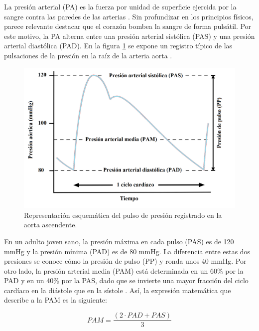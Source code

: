 La presión arterial (PA) es la fuerza por unidad de superficie ejercida por la sangre contra las paredes 
de las arterias \citep{CITE:1}. Sin profundizar en los principios físicos, parece relevante destacar que el corazón 
bombea la sangre de forma pulsátil. Por este motivo, la PA alterna entre una presión arterial sistólica (PAS) 
y una presión arterial diastólica (PAD). En la figura \ref{fig:aorticPulse} se expone un registro típico de las pulsaciones 
de la presión en la raíz de la arteria aorta \citep{CITE:2} \citep{CITE:3}. 

\begin{figure}[h!]
  \centering
  \includegraphics[width=\textwidth]{./Figures/aortic-pulse-pressure.png}
  \caption{Representación esquemática del pulso de presión registrado en la aorta ascendente\protect\footnotemark.}\label{fig:aorticPulse}
\end{figure}


En un adulto joven sano, la presión máxima en cada pulso (PAS) es de 
120 mmHg y la presión mínima (PAD) es de 80 mmHg. La diferencia entre estas dos presiones 
se conoce cómo la presión de pulso (PP) y ronda unos 40 mmHg. Por otro lado, la presión arterial media (PAM) 
está determinada en un 60\% por la PAD y en un 40\% por la PAS, dado que se invierte una mayor fracción 
del ciclo cardíaco en la diástole que en la sístole \citep{CITE:2} \citep{CITE:3}. Así, la expresión matemática que describe 
a la PAM es la siguiente: 

\begin{equation}
	\label{eq:PAM}
	PAM = \frac{(2 \cdot PAD + PAS)}{3}
\end{equation}


